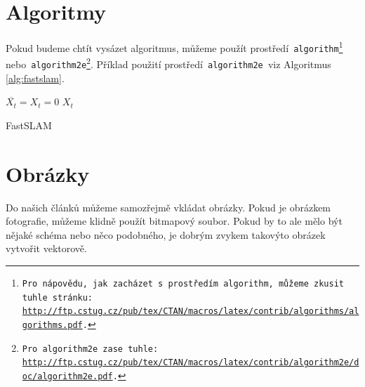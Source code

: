 \documentclass[11pt]{article}
\begin{document}
\section{Algoritmy}
\label{sec:algoritmy}
Pokud budeme chtít vysázet algoritmus, můžeme použít prostředí\texttt{ algorithm\footnote{Pro nápovědu, jak zacházet s~prostředím\texttt{ algorithm,} můžeme zkusit tuhle stránku:\\ \url{http://ftp.cstug.cz/pub/tex/CTAN/macros/latex/contrib/algorithms/algorithms.pdf}.} }nebo\texttt{ algorithm2e\footnote{Pro\texttt{ algorithm2e }zase tuhle: \url{http://ftp.cstug.cz/pub/tex/CTAN/macros/latex/contrib/algorithm2e/doc/algorithm2e.pdf}.}}.
Příklad použití prostředí\texttt{ algorithm2e }viz Algoritmus \ref{alg:fastslam}.
\\
\IncMargin{1.5em}
\begin{algorithm}[ht] 
    
    \DontPrintSemicolon
    \SetAlgoNoLine
    \LinesNumbered
    
    \Indm
    \Indp
    
    \BlankLine
    $\overline{X_t} = X_t = 0$\;
    \Return $X_t$
    
\caption{FastSLAM\label{alg:fastslam}}
\end{algorithm}
\DecMargin{1.5em}

\section{Obrázky}
Do našich článků můžeme samozřejmě vkládat obrázky. Pokud je obrázkem fotografie, můžeme klidně použít bitmapový soubor. Pokud by to ale mělo být nějaké schéma nebo něco podobného, je dobrým zvykem takovýto obrázek vytvořit vektorově.
\end{document}
